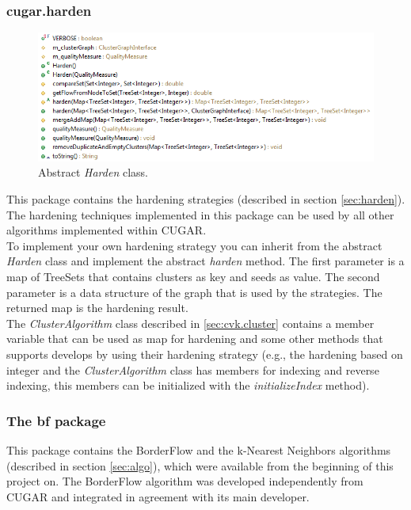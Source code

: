 \documentclass[a4paper, 11pt]{article}
\begin{document}
	\subsubsection*{cugar.harden}\label{sec:cvk.harden}
		\begin{figure}[ht!]
			\centering \includegraphics[width = 1\textwidth]{img/hardenClass.png}
			\caption{Abstract  \emph{Harden} class.} \label{fig:harden}
		\end{figure}

		This package contains the hardening strategies (described in section \ref{sec:harden}). 
		The hardening techniques implemented in this package can be used by all other algorithms implemented within CUGAR.\\
		
		To implement your own hardening strategy you can inherit from the abstract \emph{Harden} class and implement the abstract \emph{harden} method.
		The first parameter is a map of TreeSets that contains clusters as key and seeds as value. 
		The second parameter is a data structure of the graph that is used by the strategies. 
		The returned map is the hardening result.\\
		
		The \emph{ClusterAlgorithm} class described in \ref{sec:cvk.cluster} contains a member variable that can be used 
		as map for hardening and some other methods that supports develops by using their hardening strategy 
		(e.g., the hardening based on integer and the  \emph{ClusterAlgorithm} class has members for indexing and reverse indexing, this members  
		can be initialized with the \emph{initializeIndex} method).
		
	\subsubsection{The bf package}
		This package contains the BorderFlow and the k-Nearest Neighbors algorithms (described in section \ref{sec:algo}), 
		which were available from the beginning of this project on. 		
		The BorderFlow algorithm was developed independently from CUGAR and integrated in agreement with its main developer. 
	
\end{document}
